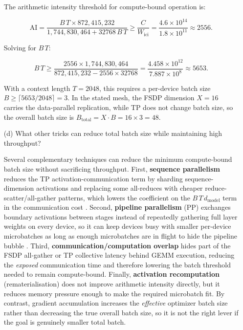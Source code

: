\documentclass[letterpaper]{article}
\begin{document}
\begin{itemize}
		The arithmetic intensity threshold for compute-bound operation is:
		
		\begin{equation}
			\text{AI} = \frac{B\,T\times 872{,}415{,}232}{1{,}744{,}830{,}464 + 32768\,B\,T}
			\geq \frac{C}{W_{\text{ici}}} = \frac{4.6\times10^{14}}{1.8\times10^{11}} \approx 2556.
		\end{equation}
		
		Solving for $B\,T$:
		
		\begin{equation}
			B\,T \geq \frac{2556\times 1{,}744{,}830{,}464}{872{,}415{,}232 - 2556\times 32768}
			= \frac{4.458\times10^{12}}{7.887\times10^{8}} \approx 5653.
		\end{equation}
		
		With a context length $T=2048$, this requires a per-device batch size $B \geq \lceil5653/2048\rceil = 3$.
		In the stated mesh, the FSDP dimension $X=16$ carries the data-parallel replication, while TP does not change batch size, so the overall batch size is $B_{\text{total}} = X\cdot B = 16\times 3 = 48$.
		
		\item[(d)] What other tricks can reduce total batch size while maintaining high throughput?
		
		Several complementary techniques can reduce the minimum compute-bound batch size without sacrificing throughput.
		First, \textbf{sequence parallelism} reduces the TP activation-communication term by sharding sequence-dimension activations and replacing some all-reduces with cheaper reduce-scatter/all-gather patterns, which lowers the coefficient on the $B\,T\,d_{\text{model}}$ term in the communication cost \cite{megatronsp}.
		Second, \textbf{pipeline parallelism} (PP) exchanges boundary activations between stages instead of repeatedly gathering full layer weights on every device, so it can keep devices busy with smaller per-device microbatches as long as enough microbatches are in flight to hide the pipeline bubble \cite{gpipe}.
		Third, \textbf{communication/computation overlap} hides part of the FSDP all-gather or TP collective latency behind GEMM execution, reducing the \emph{exposed} communication time and therefore lowering the batch threshold needed to remain compute-bound.
		Finally, \textbf{activation recomputation} (rematerialisation) does not improve arithmetic intensity directly, but it reduces memory pressure enough to make the required microbatch fit. By contrast, gradient accumulation increases the \emph{effective} optimizer batch size rather than decreasing the true overall batch size, so it is not the right lever if the goal is genuinely smaller total batch.
	\end{itemize}
	
\end{document}
